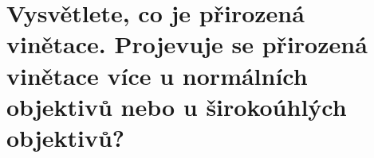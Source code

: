 \section{Vysvětlete, co je přirozená vinětace. Projevuje se přirozená vinětace více u normálních objektivů nebo u 
širokoúhlých objektivů?}